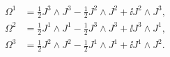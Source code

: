 \begin{equation}
\begin{aligned}
   \Omega^1 &= \tfrac{1}{2}J^3\wedge J^3 - \tfrac{1}{2}J^2\wedge J^2
      + \ii J^2\wedge J^3 , \\
   \Omega^2 &= \tfrac{1}{2}J^1\wedge J^1 - \tfrac{1}{2}J^3\wedge J^3
      + \ii J^3\wedge J^1 , \\
   \Omega^3 &= \tfrac{1}{2}J^2\wedge J^2 - \tfrac{1}{2}J^1\wedge J^1
      + \ii J^1\wedge J^2 .
\end{aligned}
\end{equation}

